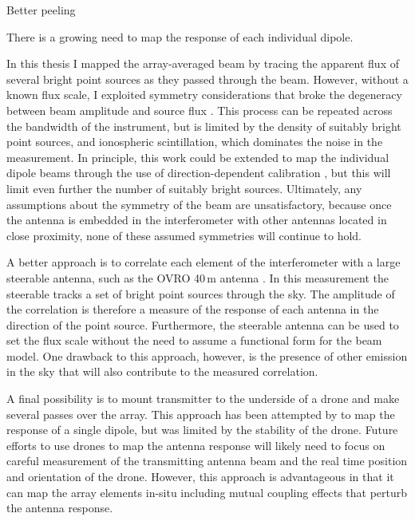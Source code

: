 \begin{bibunit}
Better peeling

There is a growing need to map the response of each individual dipole.

In this thesis I mapped the array-averaged beam by tracing the apparent flux of several bright point
sources as they passed through the beam. However, without a known flux scale, I exploited symmetry
considerations that broke the degeneracy between beam amplitude and source flux \citep[inspired
by][]{2012AJ....143...53P}. This process can be repeated across the bandwidth of the instrument, but
is limited by the density of suitably bright point sources, and ionospheric scintillation, which
dominates the noise in the measurement. In principle, this work could be extended to map the
individual dipole beams through the use of direction-dependent calibration
\citep{2008ISTSP...2..707M}, but this will limit even further the number of suitably bright sources.
Ultimately, any assumptions about the symmetry of the beam are unsatisfactory, because once the
antenna is embedded in the interferometer with other antennas located in close proximity, none of
these assumed symmetries will continue to hold.

A better approach is to correlate each element of the interferometer with a large steerable antenna,
such as the OVRO 40\,m antenna \citep[e.g.,][]{2016SPIE.9906E..0DB}. In this measurement the
steerable tracks a set of bright point sources through the sky. The amplitude of the correlation is
therefore a measure of the response of each antenna in the direction of the point source.
Furthermore, the steerable antenna can be used to set the flux scale without the need to assume a
functional form for the beam model. One drawback to this approach, however, is the presence of other
emission in the sky that will also contribute to the measured correlation.

A final possibility is to mount transmitter to the underside of a drone and make several passes over
the array. This approach has been attempted by \citet{2017PASP..129c5002J} to map the response of a
single dipole, but was limited by the stability of the drone. Future efforts to use drones to map
the antenna response will likely need to focus on careful measurement of the transmitting antenna
beam and the real time position and orientation of the drone. However, this approach is advantageous
in that it can map the array elements in-situ including mutual coupling effects that perturb the
antenna response.

\end{bibunit}

